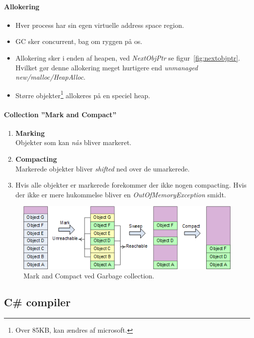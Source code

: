 \paragraph{Allokering}
\begin{itemize}
	\item Hver process har sin egen virtuelle address space region.
	\item GC sker concurrent, bag om ryggen på os.
	\item Allokering sker i enden af heapen, ved \textit{NextObjPtr} se figur~\ref{fig:nextobjptr}. Hvilket gør denne allokering meget hurtigere end \textit{unmanaged} \textit{new/malloc/HeapAlloc}.
	\item Større objekter\footnote{Over 85KB, kan ændres af microsoft.} allokeres på en speciel heap.
\end{itemize}

\paragraph{Collection ''Mark and Compact''}
\begin{enumerate}
	\item \textbf{Marking}\\
	Objekter som kan \textit{nås} bliver markeret.
	\item \textbf{Compacting}\\
	Markerede objekter bliver \textit{shifted} ned over de umarkerede.
	\item Hvis alle objekter er markerede forekommer der ikke nogen compacting. Hvis der ikke er mere hukommelse bliver en \textit{OutOfMemoryException} smidt.
\end{enumerate}

\begin{figure}[h]
\centering
\includegraphics[width=0.8\linewidth]{figs/markandsweep}
\caption{Mark and Compact ved Garbage collection.}
\label{fig:markandsweep}
\end{figure}


\subsection{C\# compiler}

